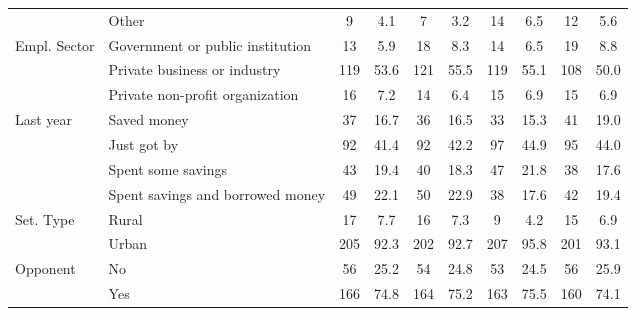 \begin{table}[!htbp]
{\begin{tabular}[t]{llcccccccc}
 & Other & 9 & 4.1 & 7 & 3.2 & 14 & 6.5 & 12 & 5.6\\
Empl. Sector & Government or public institution & 13 & 5.9 & 18 & 8.3 & 14 & 6.5 & 19 & 8.8\\
 & Private business or industry & 119 & 53.6 & 121 & 55.5 & 119 & 55.1 & 108 & 50.0\\
 & Private non-profit organization & 16 & 7.2 & 14 & 6.4 & 15 & 6.9 & 15 & 6.9\\
Last year & Saved money & 37 & 16.7 & 36 & 16.5 & 33 & 15.3 & 41 & 19.0\\
 & Just got by & 92 & 41.4 & 92 & 42.2 & 97 & 44.9 & 95 & 44.0\\
 & Spent some savings & 43 & 19.4 & 40 & 18.3 & 47 & 21.8 & 38 & 17.6\\
 & Spent savings and
borrowed money & 49 & 22.1 & 50 & 22.9 & 38 & 17.6 & 42 & 19.4\\
Set. Type & Rural & 17 & 7.7 & 16 & 7.3 & 9 & 4.2 & 15 & 6.9\\
 & Urban & 205 & 92.3 & 202 & 92.7 & 207 & 95.8 & 201 & 93.1\\
Opponent & No & 56 & 25.2 & 54 & 24.8 & 53 & 24.5 & 56 & 25.9\\
 & Yes & 166 & 74.8 & 164 & 75.2 & 163 & 75.5 & 160 & 74.1\\
\bottomrule
\end{tabular}}
\end{table}

